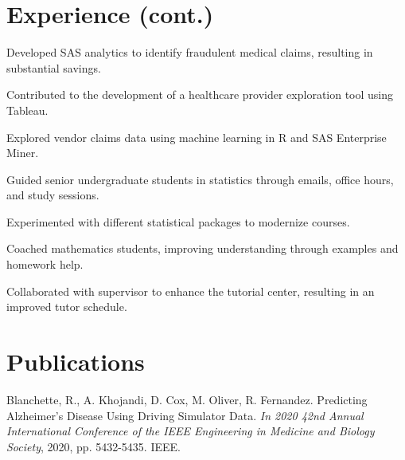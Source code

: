 \documentclass[]{plushcv}
\begin{document}
\begin{minipage}[t]{1.0\textwidth} 


\section{Experience (cont.)}

\vspace{\topsep} %
\begin{tightemize}
\sectionsep
\item Developed SAS analytics to identify fraudulent medical claims, resulting in substantial savings.
\item Contributed to the development of a healthcare provider exploration tool using Tableau.
\item Explored vendor claims data using machine learning in R and SAS Enterprise Miner.
\end{tightemize}
\sectionsep

\vspace{\topsep} %
\begin{tightemize}
\sectionsep
\item Guided senior undergraduate students in statistics through emails, office hours, and study sessions.
\item Experimented with different statistical packages to modernize courses.
\end{tightemize}
\sectionsep

\begin{tightemize}
\sectionsep
\item Coached mathematics students, improving understanding through examples and homework help.
\item Collaborated with supervisor to enhance the tutorial center, resulting in an improved tutor schedule.
\end{tightemize}
\sectionsep


\section{Publications}

Blanchette, R., A. Khojandi, D. Cox, M. Oliver, R. Fernandez. Predicting Alzheimer’s
Disease Using Driving Simulator Data. \textit{In 2020 42nd Annual International Conference of
the IEEE Engineering in Medicine and Biology Society}, 2020, pp. 5432-5435. IEEE.

\sectionsep

\end{minipage}
\end{document}
